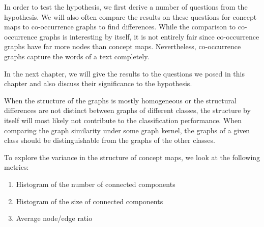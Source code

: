 


In order to test the hypothesis, we first derive a number of questions from the hypothesis.
We will also often compare the results on these questions for concept maps to co-occurrence graphs to find differences. While the comparison to co-occurrence graphs is interesting by itself, it is not entirely fair since co-occurrence graphs have far more nodes than concept maps.
Nevertheless, co-occurrence graphs capture the words of a text completely.

In the next chapter, we will give the results to the questions we posed in this chapter and also discuss their significance to the hypothesis.


When the structure of the graphs is mostly homogeneous or the structural differences are not distinct between graphs of different classes, the structure by itself will most likely not contribute to the classification performance.
When comparing the graph similarity under some graph kernel, the graphs of a given class should be distinguishable from the graphs of the other classes.

To explore the variance in the structure of concept maps, we look at the following metrics:
\begin{enumerate}
    \item{Histogram of the number of connected components}
    \item{Histogram of the size of connected components}
    \item{Average node/edge ratio}
\end{enumerate}


